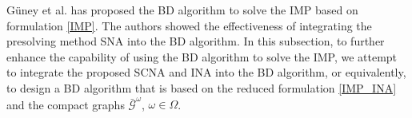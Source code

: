 \documentclass[a4paper,10pt]{article}
\theoremstyle{plain}
\begin{document}
{	G\"{u}ney et al. \cite{Guney2020} has proposed the BD algorithm to solve the IMP based on formulation \eqref{IMP}.
	The authors showed the effectiveness of integrating the presolving method SNA into the BD algorithm.
	In this subsection, to further enhance the capability of using the BD algorithm to solve the IMP, we attempt to integrate the proposed SCNA and INA into the BD algorithm, or equivalently, to design a BD algorithm that is based on the reduced formulation \eqref{IMP_INA} and the compact graphs $\bar{\mathcal{G}}^\omega$, $\omega \in \Omega$.
	
	
}
\end{document}
